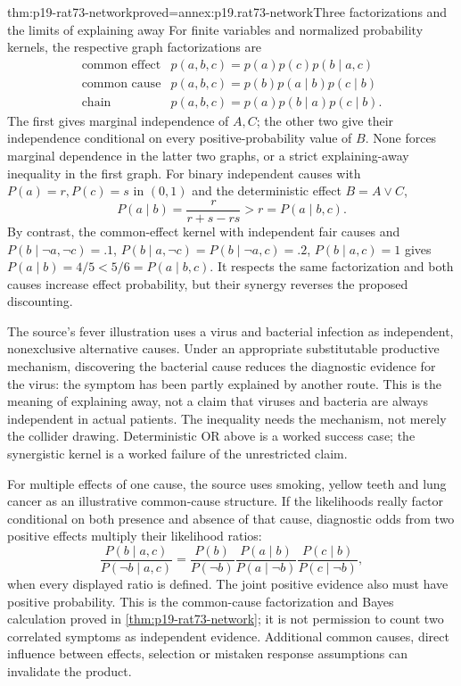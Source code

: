 \begin{hbtheorem}{thm:p19-rat73-network}{proved=annex:p19.rat73-network}{Three factorizations and the limits of explaining away}
For finite variables and normalized probability kernels, the respective
graph factorizations are
\[
\begin{array}{l|l}
 \text{common effect}&p(a,b,c)=p(a)p(c)p(b\mid a,c)\\
 \text{common cause}&p(a,b,c)=p(b)p(a\mid b)p(c\mid b)\\
 \text{chain}&p(a,b,c)=p(a)p(b\mid a)p(c\mid b).
\end{array}
\]
The first gives marginal independence of \(A,C\); the other two
give their independence conditional on every positive-probability
value of \(B\). None forces marginal dependence in the latter two
graphs, or a strict explaining-away inequality in the first graph.
For binary independent causes with \(P(a)=r,P(c)=s\) in \((0,1)\)
and the deterministic effect \(B=A\lor C\),
\[
 P(a\mid b)=\frac{r}{r+s-rs}>r=P(a\mid b,c).
\]
By contrast, the common-effect kernel with independent fair causes and
\(P(b\mid\neg a,\neg c)=.1\),
\(P(b\mid a,\neg c)=P(b\mid\neg a,c)=.2\),
\(P(b\mid a,c)=1\) gives
\(P(a\mid b)=4/5<5/6=P(a\mid b,c)\).
It respects the same factorization and both causes increase effect
probability, but their synergy reverses the proposed discounting.
\end{hbtheorem}

The source's fever illustration uses a virus and bacterial infection as
independent, nonexclusive alternative causes. Under an appropriate
substitutable productive mechanism, discovering the bacterial cause
reduces the diagnostic evidence for the virus: the symptom has been
partly explained by another route. This is the meaning of explaining
away, not a claim that viruses and bacteria are always independent in
actual patients. The inequality needs the mechanism, not merely the
collider drawing. Deterministic OR above is a worked success case;
the synergistic kernel is a worked failure of the unrestricted claim.

For multiple effects of one cause, the source uses smoking, yellow
teeth and lung cancer as an illustrative common-cause structure.
If the likelihoods really factor conditional on both presence and absence
of that cause, diagnostic odds from two positive effects multiply their
likelihood ratios:
\[
 \frac{P(b\mid a,c)}{P(\neg b\mid a,c)}
 =\frac{P(b)}{P(\neg b)}
  \frac{P(a\mid b)}{P(a\mid\neg b)}
  \frac{P(c\mid b)}{P(c\mid\neg b)},
\]
when every displayed ratio is defined. The joint positive evidence also
must have positive probability. This is the common-cause factorization
and Bayes calculation proved in \cref{thm:p19-rat73-network}; it is
not permission to count two correlated symptoms as independent evidence.
Additional common causes, direct influence between effects, selection
or mistaken response assumptions can invalidate the product.

